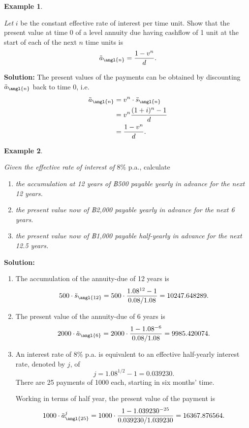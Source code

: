 \documentclass[landscape, 20pt]{extreport}
\theoremstyle{definition}
\theoremstyle{definition}
\newtheorem{example}{Example}[chapter]
\theoremstyle{definition}
\theoremstyle{definition}
\theoremstyle{remark}
\begin{document}
\newpage \begin{example}
\protect\hypertarget{exm:unlabeled-div-31}{}\label{exm:unlabeled-div-31}

\emph{Let} \(i\) be the constant effective rate of interest per time unit. Show
that the present value at time 0 of a level annuity due having cashflow
of 1 unit at the start of each of the next \(n\) time units is
\[\ddot{a}_\angl{n} =  \frac{1 - v^n }{d}.\]

\end{example}

\textbf{Solution:} The present values of the payments can be obtained by
discounting \(\ddot{a}_\angl{n}\) back to time 0, i.e.~\[\begin{aligned}
 \ddot{a}_\angl{n} &= v^n  \cdot  \ddot{s}_\angl{n} \\
            &= v^n  \frac{(1+i)^n -1 }{d} \\
            &=\frac{1 - v^n}{d}.\end{aligned}\]

\newpage \begin{example}
\protect\hypertarget{exm:unlabeled-div-32}{}\label{exm:unlabeled-div-32}

\emph{Given the effective rate of interest of} \(8\%\) p.a., calculate

\begin{enumerate}
\def\labelenumi{\arabic{enumi}.}
\item
  \emph{the accumulation at 12 years of ฿500 payable yearly in advance for
  the next 12 years.}
\item
  \emph{the present value now of ฿2,000 payable yearly in advance for the
  next 6 years.}
\item
  \emph{the present value now of ฿1,000 payable half-yearly in advance for
  the next 12.5 years.}
\end{enumerate}

\end{example}

\textbf{Solution:}

\begin{enumerate}
\def\labelenumi{\arabic{enumi}.}
\item
  The accumulation of the annuity-due of 12 years is
  \[500 \cdot \ddot{s}_\angl{12} = 500 \cdot \frac{1.08^{12} -1}{0.08/1.08} = 10247.648289.\]
\item
  The present value of the annuity-due of 6 years is
  \[2000 \cdot \ddot{a}_\angl{6} = 2000 \cdot \frac{1- 1.08^{-6}}{0.08/1.08} = 9985.420074.\]
\item
  An interest rate of 8\% p.a. is equivalent to an effective
  half-yearly interest rate, denoted by \(j\), of
  \[j = 1.08^{1/2} -1 = 0.039230.\] There are 25 payments of 1000
  each, starting in six months' time.

  Working in terms of half year, the present value of the payment is
  \[1000 \cdot \ddot{a}^j_\angl{25} = 1000 \cdot \frac{1 - 1.039230^{-25} }{0.039230/1.039230 } = 16367.876564.\]
\end{enumerate}
\end{document}
